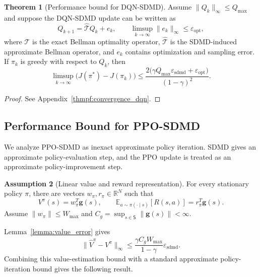 \documentclass{article}
\numberwithin{equation}{section}
\theoremstyle{definition}
\newtheorem{theorem}{Theorem}[section]
\newtheorem{assumption}[theorem]{Assumption}
\begin{document}
\begin{theorem}[Performance bound for DQN-SDMD]\label{thm:convergence_dqn}
Assume $\|Q_k\|_\infty\le Q_{\max}$ and suppose the DQN-SDMD update can be written as
\begin{equation*}
Q_{k+1}=\widehat{\mathcal{T}}Q_k+e_k,
\qquad
\limsup_{k\to\infty}\|e_k\|_\infty\le \varepsilon_{\mathrm{opt}},
\end{equation*}
where $\mathcal{T}$ is the exact Bellman optimality operator, $\widehat{\mathcal{T}}$ is the SDMD-induced approximate Bellman operator, and $e_k$ contains optimization and sampling error. If $\pi_k$ is greedy with respect to $Q_k$, then
\begin{equation}\label{eq:j_error_bound}
\limsup_{k\to\infty}\bigl(J(\pi^*)-J(\pi_k)\bigr)
\le
\frac{2\bigl(\gamma Q_{\max}\varepsilon_{\mathrm{sdmd}}+\varepsilon_{\mathrm{opt}}\bigr)}{(1-\gamma)^2}.
\end{equation}
\end{theorem}
\begin{proof} See Appendix~\ref{thmpf:convergence_dqn}. \end{proof}

\subsection{Performance Bound for PPO-SDMD}
We analyze PPO-SDMD as inexact approximate policy iteration. SDMD gives an approximate policy-evaluation step, and the PPO update is treated as an approximate policy-improvement step.

\begin{assumption}[Linear value and reward representation]\label{ass:linear_v}
For every stationary policy $\pi$, there are vectors $w_\pi,r_\pi\in\mathbb{R}^N$ such that
\[
    V^\pi(s)=w_\pi^T\mathbf{g}(s),
    \qquad
    \mathbb{E}_{a\sim\pi(\cdot\mid s)}[R(s,a)]=r_\pi^T\mathbf{g}(s).
\]
Assume $\|w_\pi\|\le W_{\max}$ and $C_g=\sup_{s\in\mathsf{S}}\|\mathbf{g}(s)\|<\infty$.
\end{assumption}

Lemma~\ref{lemma:value_error} gives
\[
    \|\widehat V^\pi-V^\pi\|_\infty
    \le
    \frac{\gamma C_g W_{\max}}{1-\gamma}\varepsilon_{\mathrm{sdmd}}.
\]
Combining this value-estimation bound with a standard approximate policy-iteration bound gives the following result.
\end{document}
